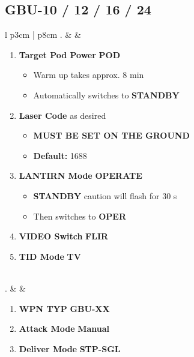 \documentclass[8pt,usenames,dvipsnames,twoside]{article}
\begin{document}
		\subsection{GBU-10 / 12 / 16 / 24}
		\begin{center}
			\begin{longtable}{l p{3cm} | p{8cm}}
				. &  & 
				\begin{minipage}[t]{\linewidth}
					\vspace{-7pt}
					\begin{enumerate}[label=(\alph*)]
						\item \textbf{Target Pod Power} \dotfill \textbf{POD}
						\begin{itemize}
							\item Warm up takes approx. 8 min
							\item Automatically switches to \textbf{STANDBY}
						\end{itemize}
						\item \textbf{Laser Code} \dotfill as desired
						\begin{itemize}
							\item \textbf{MUST BE SET ON THE GROUND}
							\item \textbf{Default:} 1688
						\end{itemize}
						\item \textbf{LANTIRN Mode} \dotfill \textbf{OPERATE}
						\begin{itemize}
							\item \textbf{STANDBY} caution will flash for 30 s
							\item Then switches to \textbf{OPER}
						\end{itemize}
						\item \textbf{VIDEO Switch} \dotfill \textbf{FLIR}
						\item \textbf{TID Mode} \dotfill \textbf{TV}
					\end{enumerate}
				\end{minipage} \\
				. &  & 
				\begin{minipage}[t]{\linewidth}
					\vspace{-7pt}
					\begin{enumerate}[label=(\alph*)]
						\item \textbf{WPN TYP} \dotfill \textbf{GBU-XX}
						\item \textbf{Attack Mode} \dotfill \textbf{Manual}
						\item \textbf{Deliver Mode} \dotfill \textbf{STP-SGL}

\end{enumerate}
\end{minipage}
\end{longtable}
\end{center}
\end{document}
